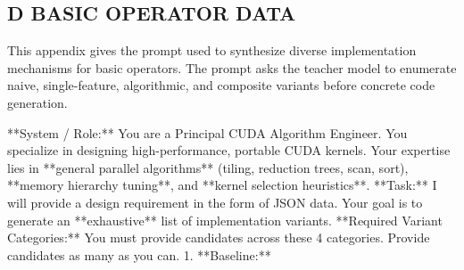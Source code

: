 \documentclass[
  10
]{article}
\newenvironment{Shaded}{}{}
\newcommand{\NormalTok}[1]{#1}
\begin{document}
\subsection{D BASIC OPERATOR DATA}\label{d-basic-operator-data}

This appendix gives the prompt used to synthesize diverse implementation
mechanisms for basic operators. The prompt asks the teacher model to
enumerate naive, single-feature, algorithmic, and composite variants
before concrete code generation.

\begin{Shaded}
\begin{Highlighting}[]
\NormalTok{**System / Role:**  }
\NormalTok{You are a Principal CUDA Algorithm Engineer. You specialize in designing high{-}performance, portable CUDA kernels. Your expertise lies in **general parallel algorithms** (tiling, reduction trees, scan, sort), **memory hierarchy tuning**, and **kernel selection heuristics**.  }
\NormalTok{**Task:**  }
\NormalTok{I will provide a design requirement in the form of JSON data. Your goal is to generate an **exhaustive** list of implementation variants.  }
\NormalTok{**Required Variant Categories:**  }
\NormalTok{You must provide candidates across these 4 categories. Provide candidates as many as you can.  }
\NormalTok{1. **Baseline:** }
\end{Highlighting}
\end{Shaded}
\end{document}
